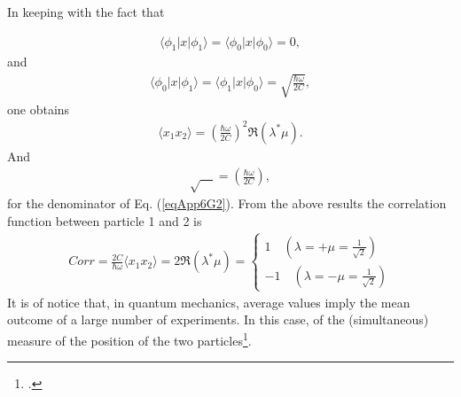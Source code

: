 \begin{subappendices}
In keeping with the fact that

\begin{align}\label{eqApp6G4}
\langle\phi_1|x|\phi_1\rangle=\langle\phi_0|x|\phi_0\rangle=0,
\end{align} 
and
\begin{align}\label{eqApp6G5}
\langle\phi_0|x|\phi_1\rangle=\langle\phi_1|x|\phi_0\rangle=\sqrt{\frac{\hbar\omega}{2C}},
\end{align}
one obtains
\begin{align}\label{eqApp6G6}
\langle x_1x_2\rangle=\left(\frac{\hbar\omega}{2C}\right)^2\Re(\lambda^*\mu).
\end{align} 
And 
\begin{align}\label{eqApp6G7}
\sqrt{\quad}=\left(\frac{\hbar\omega}{2C}\right),
\end{align}
for the denominator of Eq. (\ref{eqApp6G2}).
From the above results the correlation function between particle 1 and 2 is
\begin{align}\label{eqApp6G8}
Corr=\frac{2C}{\hbar\omega}\langle x_1x_2\rangle=2\Re(\lambda^*\mu)=
\left\{
\begin{array}{c}
 1\quad (\lambda=+\mu=\frac{1}{\sqrt{2}})\\ 
 -1 \quad (\lambda=-\mu=\frac{1}{\sqrt{2}})
\end{array}
\right. 
\end{align}
It is of notice that, in quantum mechanics, average values imply the mean outcome of a large number of experiments. In this case, of the (simultaneous) measure of the position of the two particles\footnote{\cite{Basdevant:05}.}.







\end{subappendices}
